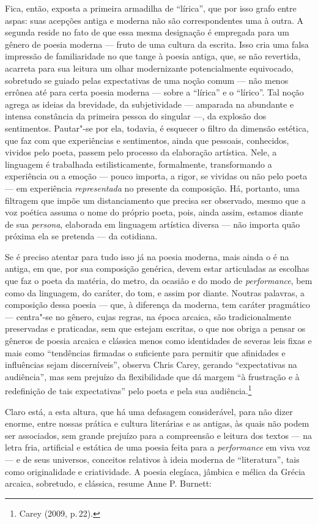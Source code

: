 Fica, então, exposta a primeira armadilha de “lírica”, que por isso grafo
entre aspas: suas acepções antiga e moderna não são correspondentes uma
à outra. A segunda reside no fato de que essa mesma designação é empregada para
um gênero de
poesia moderna --- fruto de uma cultura da escrita. Isso cria uma falsa impressão
de familiaridade no que tange à poesia antiga, que, se não revertida, acarreta
para sua leitura um olhar modernizante potencialmente equivocado, sobretudo se
guiado pelas expectativas de uma noção comum --- não menos errônea até para certa
poesia moderna --- sobre a “lírica” e o “lírico”. Tal noção agrega as ideias da
brevidade, da subjetividade --- amparada na abundante e intensa constância da
primeira pessoa do singular ---, da explosão dos sentimentos. Pautar"-se por
ela, todavia, é esquecer o filtro da dimensão estética, que faz com que
experiências e sentimentos, ainda que pessoais, conhecidos, vividos pelo poeta,
passem pelo processo da elaboração artística. Nele, a linguagem é trabalhada
estilisticamente, formalmente, transformando a experiência ou a emoção --- pouco
importa, a rigor, se vividas ou não pelo poeta --- em experiência
\emph{representada} no presente da composição. Há, portanto, uma filtragem
que impõe um distanciamento que precisa ser observado, mesmo que a voz poética
assuma o nome do próprio poeta, pois, ainda assim, estamos diante de sua
\emph{persona}, elaborada em linguagem artística diversa --- não importa
quão próxima ela se pretenda --- da cotidiana.

Se é preciso atentar para tudo isso já na poesia moderna, mais ainda o é na antiga, em que, por sua composição genérica, devem
estar articuladas as escolhas que faz o poeta da matéria, do metro, da ocasião
e do modo de \emph{performance}, bem como da linguagem, do caráter, do tom, e
assim por diante. Noutras palavras, a composição dessa poesia --- que, à diferença
da moderna, tem caráter pragmático --- centra"-se no gênero, cujas regras,
na época arcaica, são tradicionalmente preservadas e praticadas, sem que
estejam escritas, o que nos obriga a pensar os gêneros de poesia arcaica e
clássica menos como identidades de severas leis fixas e mais como
“tendências firmadas o suficiente para permitir que afinidades e influências
sejam discerníveis”, observa Chris Carey, gerando
“expectativas na audiência”, mas sem prejuízo da flexibilidade que dá margem “à
frustração e à redefinição de tais expectativas” pelo poeta e pela sua
audiência.\footnote{ Carey (2009, p.\,22).}

Claro está, a esta altura, que há uma defasagem considerável, para não dizer
 enorme, entre nossas prática e cultura literárias e as antigas, às quais não
 podem ser associados, sem grande prejuízo para a compreensão e leitura dos
 textos --- na letra fria, artificial e estática de uma poesia feita para a
 \emph{performance} em viva voz --- e de seus universos, conceitos relativos à
 ideia moderna de “literatura”, tais como originalidade e criatividade. A poesia
 elegíaca, jâmbica e mélica da Grécia arcaica, sobretudo, e clássica, resume
 Anne P. Burnett:

